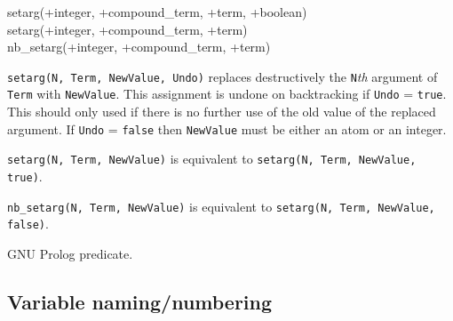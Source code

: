 \begin{TemplatesOneCol}
setarg(+integer, +compound\_term, +term, +boolean)\\
setarg(+integer, +compound\_term, +term)\\
nb\_setarg(+integer, +compound\_term, +term)

\end{TemplatesOneCol}

\Description

\texttt{setarg(N, Term, NewValue, Undo)} replaces destructively the
\texttt{N}\emph{th} argument of \texttt{Term} with \texttt{NewValue}. This
assignment is undone on backtracking if \texttt{Undo} = \texttt{true}. This
should only used if there is no further use of the old value of the replaced
argument. If \texttt{Undo} = \texttt{false} then \texttt{NewValue} must be
either an atom or an integer.

\texttt{setarg(N, Term, NewValue)} is equivalent to \texttt{setarg(N, Term,
NewValue, true)}.

\texttt{nb\_setarg(N, Term, NewValue)} is equivalent to \texttt{setarg(N, Term,
NewValue, false)}.

\begin{PlErrors}









\end{PlErrors}

\Portability

GNU Prolog predicate.

\subsection{Variable naming/numbering}
\label{Variable-naming/numbering}

